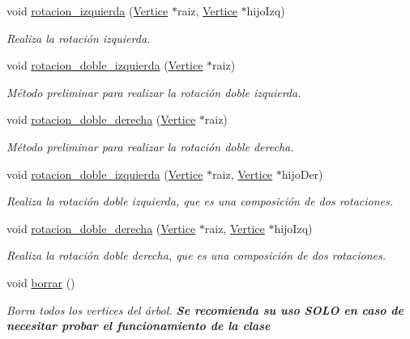 \begin{DoxyCompactItemize}
void \hyperlink{classArbolAVL_abfaf2247b607b040e328391ec8621546}{rotacion\+\_\+izquierda} (\hyperlink{classVertice}{Vertice} $\ast$raiz, \hyperlink{classVertice}{Vertice} $\ast$hijo\+Izq)
\begin{DoxyCompactList}\small\item\em Realiza la rotación izquierda. \end{DoxyCompactList}\item 
void \hyperlink{classArbolAVL_a0b4342509dd935785b6f54924e06afea}{rotacion\+\_\+doble\+\_\+izquierda} (\hyperlink{classVertice}{Vertice} $\ast$raiz)
\begin{DoxyCompactList}\small\item\em Método preliminar para realizar la rotación doble izquierda. \end{DoxyCompactList}\item 
void \hyperlink{classArbolAVL_af75605601cca6de40f6e6f5b11bfce8e}{rotacion\+\_\+doble\+\_\+derecha} (\hyperlink{classVertice}{Vertice} $\ast$raiz)
\begin{DoxyCompactList}\small\item\em Método preliminar para realizar la rotación doble derecha. \end{DoxyCompactList}\item 
void \hyperlink{classArbolAVL_a3115c59bd2be761c530eeeb11a169700}{rotacion\+\_\+doble\+\_\+izquierda} (\hyperlink{classVertice}{Vertice} $\ast$raiz, \hyperlink{classVertice}{Vertice} $\ast$hijo\+Der)
\begin{DoxyCompactList}\small\item\em Realiza la rotación doble izquierda, que es una composición de dos rotaciones. \end{DoxyCompactList}\item 
void \hyperlink{classArbolAVL_aa481f6a1014b68159b1fe753b96bde62}{rotacion\+\_\+doble\+\_\+derecha} (\hyperlink{classVertice}{Vertice} $\ast$raiz, \hyperlink{classVertice}{Vertice} $\ast$hijo\+Izq)
\begin{DoxyCompactList}\small\item\em Realiza la rotación doble derecha, que es una composición de dos rotaciones. \end{DoxyCompactList}\item 
\mbox{\label{classArbolAVL_ae47585dbdb912214f41eab88eb979e33}} 
void \hyperlink{classArbolAVL_ae47585dbdb912214f41eab88eb979e33}{borrar} ()
\begin{DoxyCompactList}\small\item\em Borra todos los vertices del árbol. {\bfseries Se recomienda su uso S\+O\+LO en caso de necesitar probar el funcionamiento de la clase} \end{DoxyCompactList}\item 

\end{DoxyCompactItemize}
